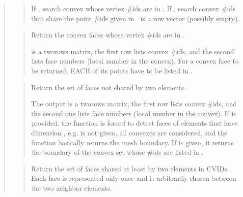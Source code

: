 \documentclass[a4paper,11pt,english]{sphinxmanual}
\begin{document}
\begin{quote}
\begin{quote}
If , search convex whose vertex \#ids are in .
If , search convex \#ids that share the point \#ids
given in .  is a row vector (possibly
empty).
\end{quote}

\begin{quote}

Return the convex faces whose vertex \#ids are in .

 is a two\sphinxhyphen{}rows matrix, the first row lists convex \#ids,
and the second lists face numbers (local number in the convex).
For a convex face to be returned, EACH of its points have to be
listed in .
\end{quote}

\begin{quote}

Return the set of faces not shared by two elements.

The output  is a two\sphinxhyphen{}rows matrix, the first row lists
convex \#ids, and the second one lists face numbers (local number
in the convex). If  is provided, the function is forced to
detect faces of elements that have dimension , e.g.  is not given, all convexes are considered, and the
function basically returns the mesh boundary. If 
is given, it returns the boundary of the convex set whose \#ids are
listed in .
\end{quote}

\begin{quote}

Return the set of faces shared at least by two elements in CVIDs.
Each face is represented only once and is arbitrarily chosen
between the two neighbor elements.
\end{quote}

\begin{quote}


\end{quote}
\end{quote}
\end{document}
